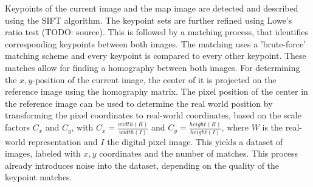 Keypoints of the current image and the map image are detected and
described using the SIFT algorithm. The keypoint sets are further refined using Lowe's ratio test (TODO: source). This is followed by a matching
process, that identifies corresponding keypoints between both
images. The matching uses a 'brute-force' matching scheme and every keypoint is compared to every other keypoint. These matches allow for finding a homography between both
images. For determining the $x, y$-position of the current image, the
center of it is projected on the reference image using the homography
matrix. The pixel position of the center in the reference image can be
used to determine the real world position by transforming the pixel
coordinates to real-world coordinates, based on the scale factors
$C_x$ and $C_y$, with $C_x = \frac{width(R)}{width(I)}$ and
$C_y = \frac{height(R)}{height(I)}$, where $W$ is the real-world
representation and $I$ the digital pixel image. This yields a dataset
of images, labeled with $x, y$ coordinates and the number of
matches. This process already introduces noise into the dataset, depending on the quality of the keypoint matches.

